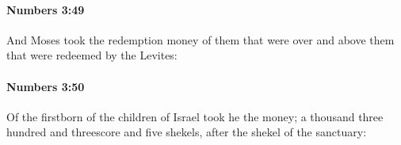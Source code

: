 		\paragraph{Numbers 3:49} %
			\label{NUMBERS-3-49}

			And Moses took the redemption money of them that were over and above them that were redeemed by the Levites:


		\paragraph{Numbers 3:50} %
			\label{NUMBERS-3-50}

			Of the firstborn of the children of Israel took he the money; a thousand three hundred and threescore and five shekels, after the shekel of the sanctuary:


